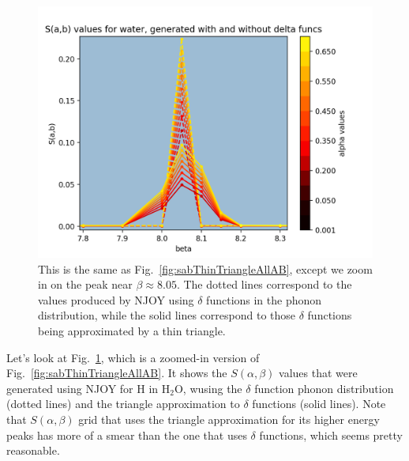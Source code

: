 \documentclass[10pt]{article}
\begin{document}
\begin{multicols}{2}
            \begin{figure}[H]
              \begin{center}
              \includegraphics[scale=0.6]{sab_thinTriangle_and_delta_all_AB_Zoomed}
                \caption{This is the same as Fig.~\ref{fig:sabThinTriangleAllAB}, except we zoom in on the peak near $\beta\approx8.05$. The dotted lines correspond to the values produced by NJOY using $\delta$ functions in the phonon distribution, while the solid lines correspond to those $\delta$ functions being approximated by a thin triangle.}
              \label{fig:sabThinTriangleAllABZoomed}
              \end{center}
            \end{figure}


            Let's look at Fig.~\ref{fig:sabThinTriangleAllABZoomed}, which is a zoomed-in version of Fig.~\ref{fig:sabThinTriangleAllAB}. It shows the $S(\alpha,\beta)$ values that were generated using NJOY for H in H$_2$O, wusing the $\delta$ function phonon distribution (dotted lines) and the triangle approximation to $\delta$ functions (solid lines). Note that $S(\alpha,\beta)$ grid that uses the triangle approximation for its higher energy peaks has more of a smear than the one that uses $\delta$ functions, which seems pretty reasonable.

            \clearpage



%  
%

\end{multicols}
\end{document}
